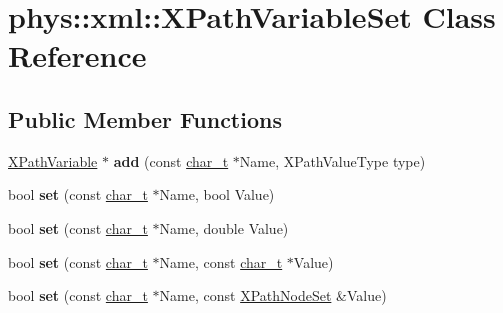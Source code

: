 \hypertarget{classphys_1_1xml_1_1XPathVariableSet}{
\section{phys::xml::XPathVariableSet Class Reference}
\label{df/dd1/classphys_1_1xml_1_1XPathVariableSet}
}
\subsection*{Public Member Functions}
\begin{DoxyCompactItemize}
\item 
\hypertarget{classphys_1_1xml_1_1XPathVariableSet_a4d4535402e313977c8464c25f2996512}{
\hyperlink{classphys_1_1xml_1_1XPathVariable}{XPathVariable} $\ast$ {\bfseries add} (const \hyperlink{namespacephys_1_1xml_afc87705cd1c2917d87b879715a2d8f6e}{char\_\-t} $\ast$Name, XPathValueType type)}
\label{df/dd1/classphys_1_1xml_1_1XPathVariableSet_a4d4535402e313977c8464c25f2996512}

\item 
\hypertarget{classphys_1_1xml_1_1XPathVariableSet_a875931270d5e15a91e4932eb8116063e}{
bool {\bfseries set} (const \hyperlink{namespacephys_1_1xml_afc87705cd1c2917d87b879715a2d8f6e}{char\_\-t} $\ast$Name, bool Value)}
\label{df/dd1/classphys_1_1xml_1_1XPathVariableSet_a875931270d5e15a91e4932eb8116063e}

\item 
\hypertarget{classphys_1_1xml_1_1XPathVariableSet_a6d0e9cc2f4bd686e7a36c6ecab204a87}{
bool {\bfseries set} (const \hyperlink{namespacephys_1_1xml_afc87705cd1c2917d87b879715a2d8f6e}{char\_\-t} $\ast$Name, double Value)}
\label{df/dd1/classphys_1_1xml_1_1XPathVariableSet_a6d0e9cc2f4bd686e7a36c6ecab204a87}

\item 
\hypertarget{classphys_1_1xml_1_1XPathVariableSet_aa624806f9744241c28421eb99ca3f376}{
bool {\bfseries set} (const \hyperlink{namespacephys_1_1xml_afc87705cd1c2917d87b879715a2d8f6e}{char\_\-t} $\ast$Name, const \hyperlink{namespacephys_1_1xml_afc87705cd1c2917d87b879715a2d8f6e}{char\_\-t} $\ast$Value)}
\label{df/dd1/classphys_1_1xml_1_1XPathVariableSet_aa624806f9744241c28421eb99ca3f376}

\item 
\hypertarget{classphys_1_1xml_1_1XPathVariableSet_a22a89f0771ed80f0423f1ef5ab5699ca}{
bool {\bfseries set} (const \hyperlink{namespacephys_1_1xml_afc87705cd1c2917d87b879715a2d8f6e}{char\_\-t} $\ast$Name, const \hyperlink{classphys_1_1xml_1_1XPathNodeSet}{XPathNodeSet} \&Value)}
\label{df/dd1/classphys_1_1xml_1_1XPathVariableSet_a22a89f0771ed80f0423f1ef5ab5699ca}


\end{DoxyCompactItemize}

